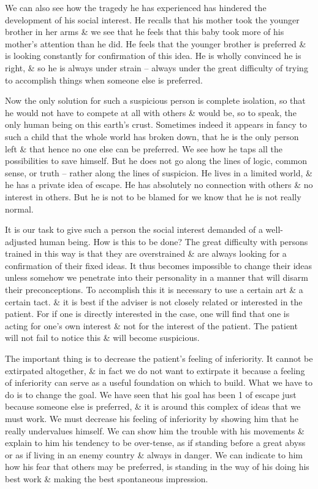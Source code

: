 \documentclass{article}
\begin{document}
We can also see how the tragedy he has experienced has hindered the development of his social interest. He recalls that his mother took the younger brother in her arms \& we see that he feels that this baby took more of his mother's attention than he did. He feels that the younger brother is preferred \& is looking constantly for confirmation of this idea. He is wholly convinced he is right, \& so he is always under strain -- always under the great difficulty of trying to accomplish things when someone else is preferred.

Now the only solution for such a suspicious person is complete isolation, so that he would not have to compete at all with others \& would be, so to speak, the only human being on this earth's crust. Sometimes indeed it appears in fancy to such a child that the whole world has broken down, that he is the only person left \& that hence no one else can be preferred. We see how he taps all the possibilities to save himself. But he does not go along the lines of logic, common sense, or truth -- rather along the lines of suspicion. He lives in a limited world, \& he has a private idea of escape. He has absolutely no connection with others \& no interest in others. But he is not to be blamed for we know that he is not really normal.

It is our task to give such a person the social interest demanded of a well-adjusted human being. How is this to be done? The great difficulty with persons trained in this way is that they are overstrained \& are always looking for a confirmation of their fixed ideas. It thus becomes impossible to change their ideas unless somehow we penetrate into their personality in a manner that will disarm their preconceptions. To accomplish this it is necessary to use a certain art \& a certain tact. \& it is best if the adviser is not closely related or interested in the patient. For if one is directly interested in the case, one will find that one is acting for one's own interest \& not for the interest of the patient. The patient will not fail to notice this \& will become suspicious.

The important thing is to decrease the patient's feeling of inferiority. It cannot be extirpated altogether, \& in fact we do not want to extirpate it because a feeling of inferiority can serve as a useful foundation on which to build. What we have to do is to change the goal. We have seen that his goal has been 1 of escape just because someone else is preferred, \& it is around this complex of ideas that we must work. We must decrease his feeling of inferiority by showing him that he really undervalues himself. We can show him the trouble with his movements \& explain to him his tendency to be over-tense, as if standing before a great abyss or as if living in an enemy country \& always in danger. We can indicate to him how his fear that others may be preferred, is standing in the way of his doing his best work \& making the best spontaneous impression.
\end{document}
